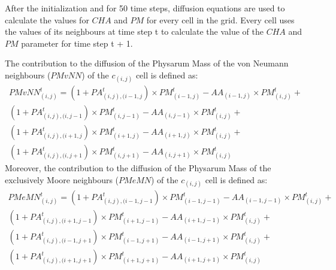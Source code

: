 \par
After the initialization and for 50 time steps, diffusion equations are used to calculate the values for $CHA$ and $PM$ for every cell in the grid. Every cell uses the values of its neighbours at time step t to calculate the value of the $CHA$ and $PM$ parameter for time step t + 1. 
\par
The contribution to the diffusion of the Physarum Mass of the von Neumann neighbours ($PMvNN$) of the $c_{(i,j)}$ cell is defined as:
\begin{equation}
\begin{split}
PMvNN^t_{(i, j)} = 
(1 + PA^t_{(i, j),(i-1, j}) \times PM^t_{(i-1, j)} - AA_{(i-1, j)} \times PM^t_{(i, j)} +
\\(1 + PA^t_{(i, j),(i, j-1}) \times PM^t_{(i, j-1)} - AA_{(i, j-1)} \times PM^t_{(i, j)} +
\\(1 + PA^t_{(i, j),(i+1, j}) \times PM^t_{(i+1, j)} - AA_{(i+1, j)} \times PM^t_{(i, j)}  +
\\(1 + PA^t_{(i, j),(i, j+1}) \times PM^t_{(i, j+1)} - AA_{(i, j+1)} \times PM^t_{(i, j)}
\end{split}
\end{equation}
Moreover, the contribution to the diffusion of the Physarum Mass of the exclusively Moore neighbours ($PMeMN$) of the $c_{(i,j)}$ cell is defined as:
\begin{equation}
\begin{split}
PMeMN^t_{(i, j)} = 
(1 + PA^t_{(i, j),(i-1, j-1}) \times PM^t_{(i-1, j-1)} - AA_{(i-1, j-1)} \times PM^t_{(i, j)} +
\\(1 + PA^t_{(i, j),(i+1, j-1}) \times PM^t_{(i+1, j-1)} - AA_{(i+1, j-1)} \times PM^t_{(i, j)} +
\\(1 + PA^t_{(i, j),(i-1, j+1}) \times PM^t_{(i-1, j+1)} - AA_{(i-1, j+1)} \times PM^t_{(i, j)}  +
\\(1 + PA^t_{(i, j),(i+1, j+1}) \times PM^t_{(i+1, j+1)} - AA_{(i+1, j+1)} \times PM^t_{(i, j)}
\end{split}
\end{equation}

